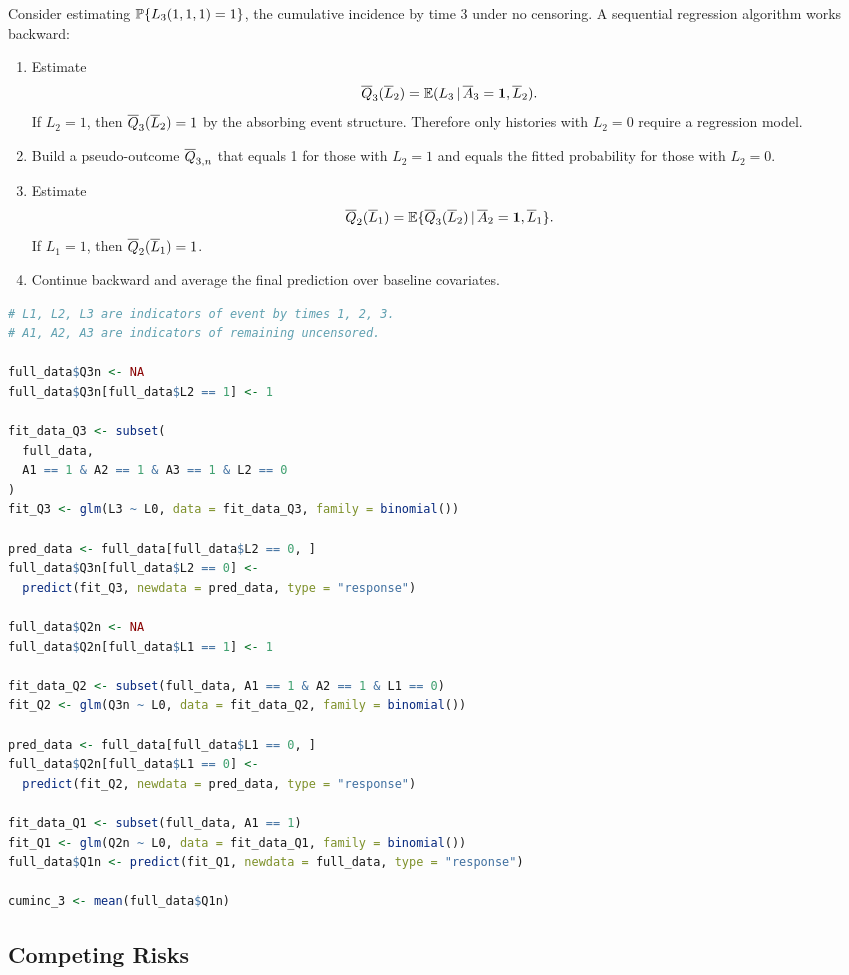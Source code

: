 Consider estimating $\mathbb{P}\{L_3(1,1,1)=1\}$, the cumulative incidence by time 3
under no censoring. A sequential regression algorithm works backward:

\begin{enumerate}
  \item Estimate
  \[
    \overline{Q}_3(\overline{L}_2)=\mathbb{E}(L_3\,\vert\, \overline{A}_3=\mathbf{1},\overline{L}_2).
  \]
  If $L_2=1$, then $\overline{Q}_3(\overline{L}_2)=1$ by the absorbing event structure.
  Therefore only histories with $L_2=0$ require a regression model.
  \item Build a pseudo-outcome $\overline{Q}_{3,n}$ that equals 1 for those with
  $L_2=1$ and equals the fitted probability for those with $L_2=0$.
  \item Estimate
  \[
    \overline{Q}_2(\overline{L}_1)=\mathbb{E}\{\overline{Q}_3(\overline{L}_2)\,\vert\, \overline{A}_2=\mathbf{1},\overline{L}_1\}.
  \]
  If $L_1=1$, then $\overline{Q}_2(\overline{L}_1)=1$.
  \item Continue backward and average the final prediction over baseline
  covariates.
\end{enumerate}

\begin{lstlisting}[language=R]
# L1, L2, L3 are indicators of event by times 1, 2, 3.
# A1, A2, A3 are indicators of remaining uncensored.

full_data$Q3n <- NA
full_data$Q3n[full_data$L2 == 1] <- 1

fit_data_Q3 <- subset(
  full_data,
  A1 == 1 & A2 == 1 & A3 == 1 & L2 == 0
)
fit_Q3 <- glm(L3 ~ L0, data = fit_data_Q3, family = binomial())

pred_data <- full_data[full_data$L2 == 0, ]
full_data$Q3n[full_data$L2 == 0] <-
  predict(fit_Q3, newdata = pred_data, type = "response")

full_data$Q2n <- NA
full_data$Q2n[full_data$L1 == 1] <- 1

fit_data_Q2 <- subset(full_data, A1 == 1 & A2 == 1 & L1 == 0)
fit_Q2 <- glm(Q3n ~ L0, data = fit_data_Q2, family = binomial())

pred_data <- full_data[full_data$L1 == 0, ]
full_data$Q2n[full_data$L1 == 0] <-
  predict(fit_Q2, newdata = pred_data, type = "response")

fit_data_Q1 <- subset(full_data, A1 == 1)
fit_Q1 <- glm(Q2n ~ L0, data = fit_data_Q1, family = binomial())
full_data$Q1n <- predict(fit_Q1, newdata = full_data, type = "response")

cuminc_3 <- mean(full_data$Q1n)
\end{lstlisting}

\subsection{Competing Risks}

